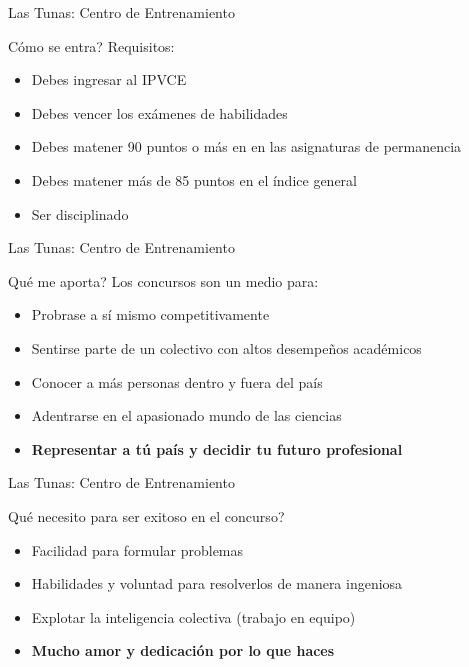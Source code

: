 \documentclass{beamer}
\begin{document}
\begin{frame}{\LARGE Las Tunas: Centro de Entrenamiento}
  \Large
  \begin{block}{C\'omo se entra?} 
   \pause
	Requisitos:
	\begin{itemize}
	  \item Debes ingresar al IPVCE %
	  \pause
	  \item Debes vencer los ex\'amenes de habilidades
	  \pause
	  \item Debes matener 90 puntos o m\'as en en las asignaturas de permanencia
	  \pause
	  \item Debes matener m\'as de 85 puntos en el \'indice general
	  \pause
	  \item Ser disciplinado
	\end{itemize}
  \end{block}
  
\end{frame}

\begin{frame}{\LARGE Las Tunas: Centro de Entrenamiento}
  \Large
  \begin{block}{Qu\'e me aporta?} 
  Los concursos son un medio para:
   \pause
	\begin{itemize}
	  \item Probrase a s\'i mismo competitivamente
	  \pause
	  \item Sentirse parte de un colectivo con altos desempe\~nos acad\'emicos
	  \pause	  
	  \item Conocer a m\'as personas dentro y fuera del pa\'is 
	  \pause
	  \item Adentrarse en el apasionado mundo de las ciencias
	  \pause
      \item \textbf{Representar a t\'u pa\'is y decidir tu futuro profesional}
	\end{itemize}
  \end{block}
  
\end{frame}

\begin{frame}{\LARGE Las Tunas: Centro de Entrenamiento}
  \Large
  \begin{block}{Qu\'e necesito para ser exitoso en el concurso?} 
   \pause
	\begin{itemize}
	  \item Facilidad para formular problemas
	  \pause
      \item Habilidades y voluntad para resolverlos de manera ingeniosa
      \pause      	
	  \item Explotar la inteligencia colectiva (trabajo en equipo) 
	  \pause	  
	  \item \textbf{Mucho amor y dedicaci\'on por lo que haces}
	\end{itemize}
  \end{block}
  
\end{frame}
\end{document}
